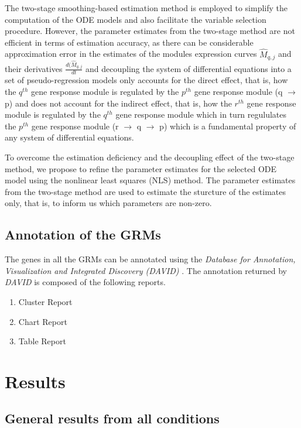 The two-stage smoothing-based estimation method is employed to simplify the computation of the ODE models and also facilitate the variable selection procedure. However, the parameter estimates from the two-stage method are not efficient in terms of estimation accuracy, as there can be considerable approximation error in the estimates of the modules expression curves $\hat{M}_{q,j}$ and their derivatives $\frac{d(\hat{M}_{q,j}}{dt}$ and decoupling the system of differential equations into a set of pseudo-regression models only accounts for the direct effect, that is, how the $q^{th}$ gene response module is regulated by the $p^{th}$ gene response module (q $\rightarrow$ p) and does not account for the indirect effect, that is, how the $r^{th}$ gene response module is regulated by the $q^{th}$ gene response module which in turn regululates the $p^{th}$ gene response module (r $\rightarrow$ q $\rightarrow$ p) which is a fundamental property of any system of differential equations.

To overcome the estimation deficiency and the decoupling effect of the two-stage method, we propose to refine the parameter estimates for the selected ODE model using the nonlinear least squares (NLS) method. The parameter estimates from the two-stage method are used to estimate the sturcture of the estimates only, that is, to inform us which parameters are non-zero.


\subsection{Annotation of the GRMs}
\label{section:david}

The genes in all the GRMs can be annotated using the \textit{Database for Annotation, Visualization and Integrated Discovery (DAVID)} \citep{huang2009systematic,huang2009bioinformatics}. The annotation returned by \textit{DAVID} is composed of the following reports.

\begin{enumerate}
\item Cluster Report
\item Chart Report
\item Table Report   
\end{enumerate}

\section{Results}
\label{section:results}

\subsection{General results from all conditions}
\label{section:general_results}

